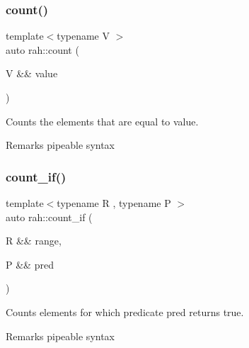 \subsubsection{\texorpdfstring{count()}{count()}\hspace{0.1cm}{\footnotesize\ttfamily [2/2]}}
{\footnotesize\ttfamily template$<$typename V $>$ \\
auto rah\+::count (\begin{DoxyParamCaption}\item[{V \&\&}]{value }\end{DoxyParamCaption})}



Counts the elements that are equal to value. 

\begin{DoxyRemark}{Remarks}
pipeable syntax
\end{DoxyRemark}

\begin{DoxyCodeInclude}{0}
\end{DoxyCodeInclude}
\mbox{\label{namespacerah_a8e6a379c05d482a52137f5647783fe27}} 
\subsubsection{\texorpdfstring{count\_if()}{count\_if()}\hspace{0.1cm}{\footnotesize\ttfamily [1/2]}}
{\footnotesize\ttfamily template$<$typename R , typename P $>$ \\
auto rah\+::count\+\_\+if (\begin{DoxyParamCaption}\item[{R \&\&}]{range,  }\item[{P \&\&}]{pred }\end{DoxyParamCaption})}



Counts elements for which predicate pred returns true. 

\begin{DoxyRemark}{Remarks}
pipeable syntax
\end{DoxyRemark}

\begin{DoxyCodeInclude}{0}
\end{DoxyCodeInclude}
\mbox{\label{namespacerah_a9e22b56a1f28a353659fed572f33f5a9}} 
